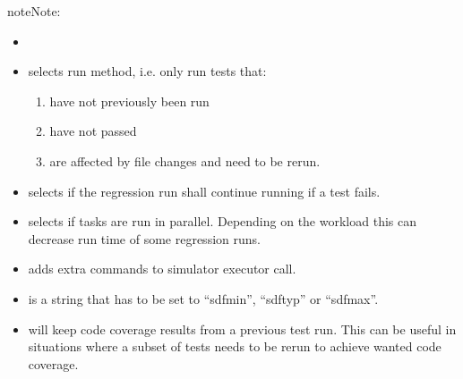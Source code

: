 \documentclass[letterpaper,10pt,english]{sphinxmanual}
\begin{document}
\begin{sphinxadmonition}{note}{Note:}\begin{itemize}
\item {} 

\item {} 
\sphinxAtStartPar
{} selects run method, i.e. only run tests that:
\begin{enumerate}
%
\item {} 
\sphinxAtStartPar
have not previously been run

\item {} 
\sphinxAtStartPar
have not passed

\item {} 
\sphinxAtStartPar
are affected by file changes and need to be rerun.

\end{enumerate}

\item {} 
\sphinxAtStartPar
{} selects if the regression run shall continue running if a test fails.

\item {} 
\sphinxAtStartPar
{} selects if tasks are run in parallel. Depending on the workload this can decrease run time of some
regression runs.

\item {} 
\sphinxAtStartPar
{} adds extra commands to simulator executor call.

\item {} 
\sphinxAtStartPar
{} is a string that has to be set to “\sphinxhyphen{}sdfmin”, “\sphinxhyphen{}sdftyp” or “\sphinxhyphen{}sdfmax”.

\item {} 
\sphinxAtStartPar
{} will keep code coverage results from a previous test run. This can be useful in situations where
a subset of tests needs to be rerun to achieve wanted code coverage.


\end{itemize}
\end{sphinxadmonition}
\end{document}
